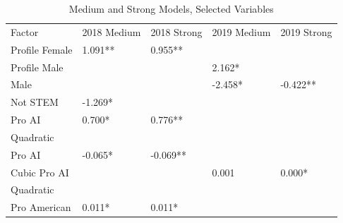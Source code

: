 \documentclass[AER]{./aea-latex-templates/AEA}
\begin{document}
        \begin{table}
            \caption{Medium and Strong Models, Selected Variables}
            \begin{tabular}{lllll}
            Factor & 2018 Medium & 2018 Strong & 2019 Medium & 2019 Strong \\
            Profile Female & 1.091** & 0.955** \\ %
            Profile Male &  &  & 2.162* &  \\ %
            Male &  &  & -2.458* & -0.422** \\
            Not STEM & -1.269* \\ %
            Pro AI & 0.700* & 0.776** \\ %
            Quadratic
            \\Pro AI & -0.065* & -0.069** \\ %
            Cubic Pro AI &  &  & 0.001 & 0.000* \\ %
            Quadratic
            \\Pro American & 0.011* & 0.011* \\ %

\end{tabular}
\end{table}
\end{document}
